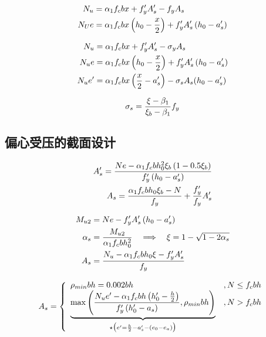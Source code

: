 \begin{align}
    N_u &= \alpha_1f_cbx + f_y^\prime A_s^\prime - f_yA_s\\
    N_Ue &= \alpha_1f_cbx\left(h_0 - {x\over2}\right) + f_y^\prime A_s^\prime\left(h_0 - a_s^\prime\right)
\end{align}

\begin{align}
    N_u &= \alpha_1f_cbx + f_y^\prime A_s^\prime - \sigma_yA_s\label{eqa:baleqaxpx}\\
    N_ue &= \alpha_1f_cbx\left(h_0 - {x\over2}\right) + f_y^\prime A_s^\prime\left(h_0 - %
    a_s^\prime\right)\\
    N_ue^\prime &= \alpha_1f_cbx\left({x\over2} - a_s^\prime\right) - \sigma_sA_s(h_0 - a_s^\prime)
\end{align}

\begin{equation}
    \sigma_s = {\xi - \beta_1\over\xi_b - \beta_1}f_y
\end{equation}

\subsection{偏心受压的截面设计}
\begin{align}
    A_s^\prime = {Ne - \alpha_1f_cbh_0^2\xi_b\left(1-0.5\xi_b\right)\over %
    f_y^\prime\left(h_0 - a_s^\prime\right)}\\
    A_s = {\alpha_1f_cbh_0\xi_b - N\over f_y} + {f_y^\prime\over f_y}A_s^\prime
\end{align}

\begin{align}
    M_{u2} &= Ne - f_y^\prime A_s^\prime\left(h_0 - a_s^\prime\right)\\
    \alpha_s &= {M_{u2}\over\alpha_1f_cbh_0^2}\quad%
    \Longrightarrow\quad\xi=1-\sqrt{1-2\alpha_s}\\
    A_s &= {N_u - \alpha_1f_cbh_0\xi - f_y^\prime A_s^\prime\over f_y}
\end{align}

\begin{align}
    A_s = \left\{\begin{array}{l l}
            \rho_{min}bh = 0.002bh & , N \le f_cbh\cr
            \underbrace{\max\left({N_ue^\prime - \alpha_1f_cbh\left(h_0^\prime - {h\over2}\right)\over %
                f_y^\prime\left(h_0^\prime - a_s\right)}, \rho_{min}bh\right)}_{%
            \star{\bigl(e^\prime = {h\over2} - a_s^\prime - (e_0 -e_a)\bigr)}}& , N > f_cbh
    \end{array}\right.
\end{align}

